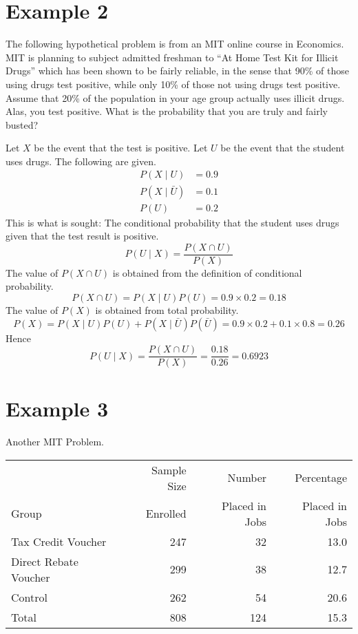 \documentclass[12pt]{article}
\begin{document}
\section*{Example 2}

The following hypothetical problem is from an MIT online course in Economics.
MIT is planning to subject admitted freshman to
``At Home Test Kit for Illicit Drugs'' which has been shown to be fairly
reliable, in the sense that 90\% of those using drugs test positive,
while only 10\% of those not using drugs test positive.
Assume that 20\% of the population in your age group actually uses illicit drugs.
Alas, you test positive.
What is the probability that you are truly and fairly busted?

Let $X$ be the event that the test is positive.
Let $U$ be the event that the student uses drugs.
The following are given.
\begin{align*}
P(X\mid U)&=0.9\\
P(X\mid \bar U)&=0.1\\
P(U)&=0.2
\end{align*}
This is what is sought:
The conditional probability that the student
uses drugs given that the test result is positive.
\[
P(U\mid X)=\frac{P(X\cap U)}{P(X)}
\]
The value of $P(X\cap U)$ is obtained from the definition of
conditional probability.
\[
P(X\cap U)=P(X\mid U) P(U)=0.9\times0.2=0.18
\]
The value of $P(X)$ is obtained from total probability.
\[
P(X)=P(X\mid U)P(U)+P(X\mid\bar U)P(\bar U)
=0.9\times0.2+0.1\times0.8=0.26
\]
Hence
\[
P(U\mid X)=\frac{P(X\cap U)}{P(X)}=\frac{0.18}{0.26}=0.6923
\]

\section*{Example 3}

Another MIT Problem.

\bigskip
\begin{center}
\begin{tabular}{lrrr}
\hline
& Sample Size & Number & Percentage\\
Group & Enrolled & Placed in Jobs & Placed in Jobs\\
\hline
Tax Credit Voucher & 247 & 32 & 13.0\\
Direct Rebate Voucher & 299 & 38 & 12.7\\
Control & 262 & 54 & 20.6\\
Total & 808 & 124 & 15.3\\
\hline
\end{tabular}
\end{center}
\end{document}
